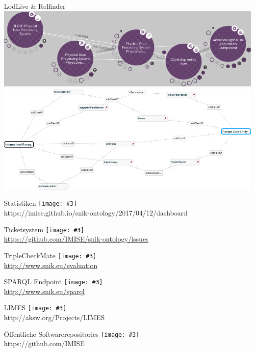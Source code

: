 \documentclass{beamer}
\newcommand{\imageslide}[4][]
{
\begin{frame}{#2}
\centering\texttt{[image: \#3]}
\\#1
\note{#4}
\end{frame}
}
\begin{document}
\begin{frame}{LodLive \& Relfinder}
\centering
\includegraphics[width=\textwidth]{img/lodlive.png}\\
\includegraphics[width=\textwidth]{img/relfinder.png}
\end{frame}



\imageslide[https://imise.github.io/snik-ontology/2017/04/12/dashboard]{Statistiken}{img/dashboard-medley.png}{}
\imageslide[\url{https://github.com/IMISE/snik-ontology/issues}]{Ticketsystem}{img/gitissue.png}{}
\imageslide[\url{http://www.snik.eu/evaluation}]{TripleCheckMate}{img/triplecheckmate.png}{}



\imageslide[\url{http://www.snik.eu/sparql}]{SPARQL Endpoint}{img/sparqlresult.png}{}

\imageslide[http://aksw.org/Projects/LIMES]{LIMES}{img/limes.png}{}

\imageslide[https://github.com/IMISE]{Öffentliche Softwarerepositories}{img/github.png}{}
\end{document}

